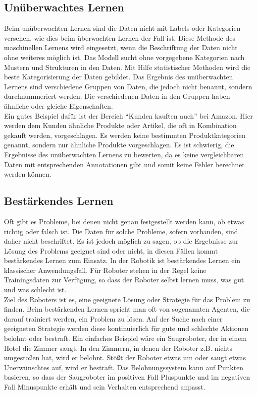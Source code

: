 \subsection{Unüberwachtes Lernen}
\label{sec:UnüberwachtesLernen}
Beim unüberwachten Lernen sind die Daten nicht mit Labels oder Kategorien versehen, wie dies beim überwachten Lernen der Fall ist. Diese Methode des maschinellen Lernens wird eingesetzt, wenn die Beschriftung der Daten nicht ohne weiteres möglich ist. Das \gls{Modell} sucht ohne vorgegebene Kategorien nach Mustern und Strukturen in den Daten. Mit Hilfe statistischer Methoden wird die beste Kategorisierung der Daten gebildet. Das Ergebnis des unüberwachten Lernens sind verschiedene Gruppen von Daten, die jedoch nicht benannt, sondern durchnummeriert werden. Die verschiedenen Daten in den Gruppen haben ähnliche oder gleiche Eigenschaften.\\
Ein gutes Beispiel dafür ist der Bereich ``Kunden kauften auch'' bei Amazon. Hier werden dem Kunden ähnliche Produkte oder Artikel, die oft in Kombination gekauft werden, vorgeschlagen. Es werden keine bestimmten Produktkategorien genannt, sondern nur ähnliche Produkte vorgeschlagen. Es ist schwierig, die Ergebnisse des unüberwachten Lernens zu bewerten, da es keine vergleichbaren Daten mit entsprechenden Annotationen gibt und somit keine Fehler berechnet werden können.\cite[vgl.][]{Lang2023,Frochte2020}


\subsection{Bestärkendes Lernen}
\label{sec:BestärkendesLernen}
Oft gibt es Probleme, bei denen nicht genau festgestellt werden kann, ob etwas richtig oder falsch ist. Die Daten für solche Probleme, sofern vorhanden, sind daher nicht beschriftet. Es ist jedoch möglich zu sagen, ob die Ergebnisse zur Lösung des Problems geeignet sind oder nicht, in diesen Fällen kommt bestärkendes Lernen zum Einsatz. In der Robotik ist bestärkendes Lernen ein klassischer Anwendungsfall. Für Roboter stehen in der Regel keine Trainingsdaten zur Verfügung, so dass der Roboter selbst lernen muss, was gut und was schlecht ist. \cite[vgl.][]{Ertel2021} \\
Ziel des Roboters ist es, eine geeignete Lösung oder Strategie für das Problem zu finden. Beim bestärkenden Lernen spricht man oft von sogenannten Agenten, die darauf trainiert werden, ein Problem zu lösen. Auf der Suche nach einer geeigneten Strategie werden diese kontinuierlich für gute und schlechte Aktionen belohnt oder bestraft. Ein einfaches Beispiel wäre ein Saugroboter, der in einem Hotel die Zimmer saugt. In den Zimmern, in denen der Roboter z.B. nichts umgestoßen hat, wird er belohnt. Stößt der Roboter etwas um oder saugt etwas Unerwünschtes auf, wird er bestraft. \cite[vgl.][]{Frochte2020} Das Belohnungssystem kann auf Punkten basieren, so dass der Saugroboter im positiven Fall Pluspunkte und im negativen Fall Minuspunkte erhält und sein Verhalten entsprechend anpasst.

